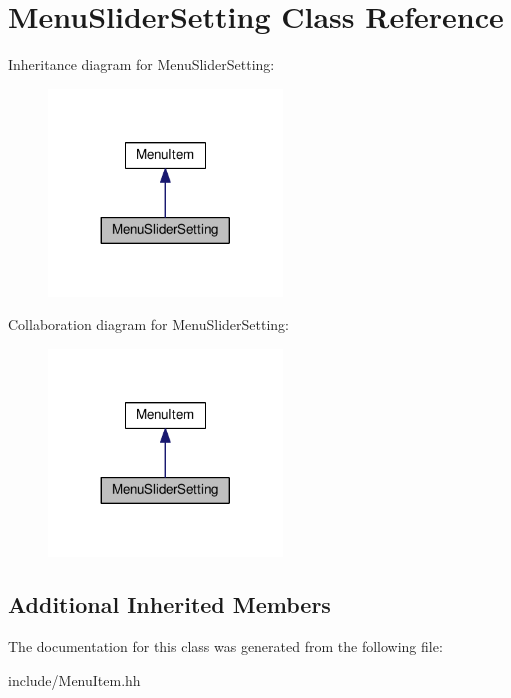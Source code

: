 \hypertarget{classMenuSliderSetting}{}\section{Menu\+Slider\+Setting Class Reference}
\label{classMenuSliderSetting}


Inheritance diagram for Menu\+Slider\+Setting\+:\nopagebreak
\begin{figure}[H]
\begin{center}
\leavevmode
\includegraphics[width=176pt]{classMenuSliderSetting__inherit__graph}
\end{center}
\end{figure}


Collaboration diagram for Menu\+Slider\+Setting\+:\nopagebreak
\begin{figure}[H]
\begin{center}
\leavevmode
\includegraphics[width=176pt]{classMenuSliderSetting__coll__graph}
\end{center}
\end{figure}
\subsection*{Additional Inherited Members}


The documentation for this class was generated from the following file\+:\begin{DoxyCompactItemize}
\item 
include/Menu\+Item.\+hh\end{DoxyCompactItemize}

